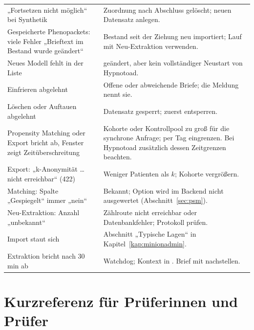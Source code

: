 \documentclass[11pt,a4paper,parskip=half-,headings=standardclasses,toc=bibliography,open=any]{scrreprt}
\begin{document}
\begin{longtable}{@{}P{5.0cm}p{9.6cm}@{}}
„Fortsetzen nicht möglich“ bei Synthetik & Zuordnung nach Abschluss gelöscht; neuen Datensatz anlegen.\\
Gespeicherte Phenopackets: viele Fehler „Brieftext im Bestand wurde geändert“ & Bestand seit der Ziehung neu importiert; Lauf mit Neu-Extraktion verwenden.\\
Neues Modell fehlt in der Liste &  geändert, aber kein vollständiger Neustart von Hypnotoad.\\
Einfrieren abgelehnt & Offene oder abweichende Briefe; die Meldung nennt sie.\\
Löschen oder Auftauen abgelehnt & Datensatz gesperrt; zuerst entsperren.\\
Propensity Matching oder Export bricht ab, Fenster zeigt Zeitüberschreitung & Kohorte oder Kontrollpool zu groß für die synchrone Anfrage; per Tag eingrenzen. Bei Hypnotoad zusätzlich dessen Zeitgrenzen beachten.\\
Export: „k-Anonymität … nicht erreichbar“ (422) & Weniger Patienten als $k$; Kohorte vergrößern.\\
Matching: Spalte „Gespiegelt“ immer „nein“ & Bekannt; Option wird im Backend nicht ausgewertet (Abschnitt~\ref{sec:psm}).\\
Neu-Extraktion: Anzahl „unbekannt“ & Zählroute nicht erreichbar oder Datenbankfehler; Protokoll prüfen.\\
Import staut sich & Abschnitt „Typische Lagen“ in Kapitel~\ref{kap:minionadmin}.\\
Extraktion bricht nach 30\,min ab & Watchdog; Kontext in . Brief mit  nachstellen.\\
\bottomrule
\end{longtable}

\appendix
\chapter{Kurzreferenz für Prüferinnen und Prüfer}\label{anh:kurz}
\end{document}

